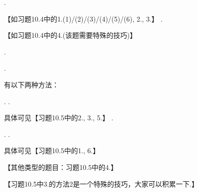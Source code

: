 \documentclass[12pt,UTF8]{ctexart}
\begin{document}
\begin{enumerate}
\begin{enumerate}
.

【如习题10.4中的1.(1)/(2)/(3)/(4)/(5)/(6), 2., 3.】
.

【如习题10.4中的4.(该题需要特殊的技巧)】
\end{enumerate}

.
\begin{enumerate}
.

有以下两种方法：
\begin{enumerate}
.
.
\end{enumerate}
具体可见【习题10.5中的2., 3., 5.】
.
\begin{enumerate}
.
.
\end{enumerate}
具体可见【习题10.5中的1., 6.】
\end{enumerate}
【其他类型的题目：习题10.5中的4.】

【习题10.5中3.的方法2是一个特殊的技巧，大家可以积累一下.】
\end{enumerate}
\end{document}
